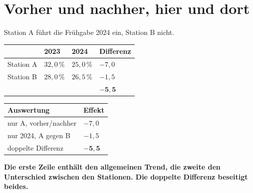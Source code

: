 \section{Vorher und nachher, hier und dort}

\begin{merksatz}
Station A führt die Frühgabe 2024 ein, Station B nicht.

\begin{center}
{\small
\renewcommand{\arraystretch}{1.5}
\begin{tabular}{@{}P{2.0cm}P{2.0cm}P{2.0cm}P{2.2cm}@{}}
\toprule
& \textbf{2023} & \textbf{2024} & \textbf{Differenz}\\
\midrule
Station A & $32{,}0\,\%$ & $25{,}0\,\%$ & $-7{,}0$\\
Station B & $28{,}0\,\%$ & $26{,}5\,\%$ & $-1{,}5$\\
\midrule
& & & $\mathbf{-5{,}5}$\\
\bottomrule
\end{tabular}}
\end{center}

\begin{center}
{\small
\renewcommand{\arraystretch}{1.5}
\begin{tabular}{@{}P{3.4cm}P{2.4cm}@{}}
\toprule
\textbf{Auswertung} & \textbf{Effekt}\\
\midrule
nur A, vorher/nachher & $-7{,}0$\\
nur 2024, A gegen B & $-1{,}5$\\
doppelte Differenz & $\mathbf{-5{,}5}$\\
\bottomrule
\end{tabular}}
\end{center}

\begin{center}
\begin{minipage}{0.9\textwidth}
\textbf{Die erste Zeile enthält den allgemeinen Trend, die zweite den Unterschied zwischen den Stationen. Die doppelte Differenz beseitigt beides.}
\end{minipage}
\end{center}

\begin{center}
\begin{minipage}{0.88\textwidth}
\end{minipage}
\end{center}


\end{merksatz}
